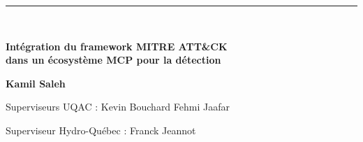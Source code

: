 \documentclass[aspectratio=169,11pt]{beamer}
\begin{document}
\begin{frame}[plain]
  \vfill
  \begin{center}
    {\color{colTitre}\rule{0.55\textwidth}{1.3pt}}\\[0.9em]
    {\LARGE\bfseries\color{colTitre}Int\'egration du framework MITRE ATT\&CK\\[0.2em]
      dans un \'ecosyst\`eme MCP pour la d\'etection\par}
    \vspace{0.6em}
    
    \vspace{1.3em}
    {\large\bfseries Kamil Saleh\par}
    \vspace{0.5em}
    {\small\color{colGris}Superviseurs UQAC : Kevin Bouchard \textbullet{}
      Fehmi Jaafar\par}
    {\small\color{colGris}Superviseur Hydro-Qu\'ebec : Franck Jeannot\par}
    \vspace{0.7em}
  
  \end{center}
  \vfill
  
\end{frame}
\end{document}
